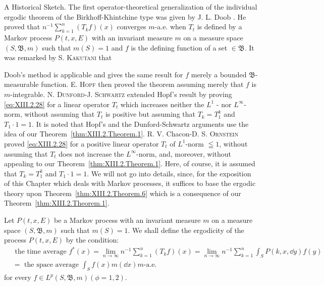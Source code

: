 A Historical Sketch. The first operator-theoretical generalization of the individual ergodic theorem of the Birkhoff-Khintchine type was given by J. L. Doob \cite{doob40}. He proved that $n^{-1} \sum\limits_{k=1}^{n} (T_k f)(x)$ converges $m$-a.e. when $T_t$ is defined by a Markov process $P(t, x, E)$ with an invariant measure $m$ on a measure space $(S, \mathfrak{B}, m)$ such that $m(S) = 1$ and $f$ is the defining function of a set $\in \mathfrak{B}$. It was remarked by S. \textsc{Kakutani} \cite{kakutani130} that 

Doob's method is applicable and gives the same result for $f$ merely a bounded $\mathfrak{B}$-measurable function. E. \textsc{Hopf} \cite{hirsch110} then proved the theorem assuming merely that $f$ is $m$-integrable. N. \textsc{Dunford}-J. \textsc{Schwartz} \cite{dunford47} extended Hopf's result by proving \eqref{eq:XIII.2.28} for a linear operator $T_{t}$ which increases neither the $L^{1}$ - nor $L^{\infty}$-norm, without assuming that $T_{t}$ is positive but assuming that $T_{k} = T_{1}^{k}$ and $T_{1} \cdot 1 = 1$. It is noted that Hopf's and the Dunford-Schwartz arguments use the idea of our Theorem~\ref{thm:XIII.2.Theorem.1}. R. V. Chacon-D. S. \textsc{Ornstein} \cite{chacon32} proved \eqref{eq:XIII.2.28} for a positive linear operator $T_{t}$ of $L^{1}$-norm $\leqq 1$, without assuming that $T_{t}$ does not increase the $L^{\infty}$-norm, and, moreover, without appealing to our Theorem~\ref{thm:XIII.2.Theorem.1}. Here, of course, it is assumed that $T_{k} = T_{1}^{k}$ and $T_{1} \cdot 1 = 1$. We will not go into details, since, for the exposition of this Chapter which deals with Markov processes, it suffices to base the ergodic theory upon Theorem~\ref{thm:XIII.2.Theorem.6} which is a consequence of our Theorem~\ref{thm:XIII.2.Theorem.1}. 


\label{sec:XIII.3}

Let $P(t, x, E)$ be a Markov process with an invariant measure $m$ on a measure space $(S, \mathfrak{B}, m)$ such that $m(S) = 1$. We shall define the ergodicity of the process $P(t, x, E)$ by the condition: 
\begin{equation}\label{eq:XIII.3.1}
\begin{aligned}
&\text{ the time average }  f ^{*} (x) = \lim\limits _{n \to \infty} n ^{-1} \sum\limits_{k=1} ^{n} (T _{k} f) (x) = \lim\limits _{n \to \infty} n ^{-1} \sum\limits_{k=1} ^{n} \int_{S} P (k, x, \dd y) f (y) \\
&= \text{ the space average } \int_{S} f (x) m (\dd x) m\text{-a.e.}
\end{aligned}
\end{equation}
for every $f \in L^{p}(S, \mathfrak{B}, m) (\phi = 1, 2)$. 

